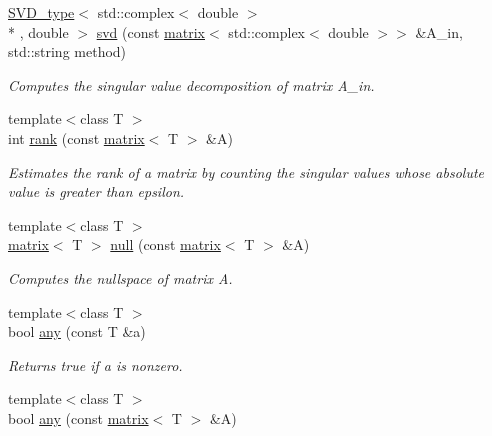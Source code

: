 \begin{DoxyCompactItemize}
\item 
\hypertarget{namespacekeycpp_ad610adca37ac4c85df23b899d29d5dfc}{\hyperlink{classkeycpp_1_1_s_v_d__type}{S\-V\-D\-\_\-type}$<$ std\-::complex$<$ double $>$\\*
, double $>$ \hyperlink{namespacekeycpp_ad610adca37ac4c85df23b899d29d5dfc}{svd} (const \hyperlink{classkeycpp_1_1matrix}{matrix}$<$ std\-::complex$<$ double $>$$>$ \&A\-\_\-in, std\-::string method)}\label{namespacekeycpp_ad610adca37ac4c85df23b899d29d5dfc}

\begin{DoxyCompactList}\small\item\em Computes the singular value decomposition of matrix A\-\_\-in. \end{DoxyCompactList}\item 
\hypertarget{namespacekeycpp_aeb9efbc77cc58fa22403ea7ae5f4555c}{{\footnotesize template$<$class T $>$ }\\int \hyperlink{namespacekeycpp_aeb9efbc77cc58fa22403ea7ae5f4555c}{rank} (const \hyperlink{classkeycpp_1_1matrix}{matrix}$<$ T $>$ \&A)}\label{namespacekeycpp_aeb9efbc77cc58fa22403ea7ae5f4555c}

\begin{DoxyCompactList}\small\item\em Estimates the rank of a matrix by counting the singular values whose absolute value is greater than epsilon. \end{DoxyCompactList}\item 
\hypertarget{namespacekeycpp_a8f497e2da901adba0e1257be943595a1}{{\footnotesize template$<$class T $>$ }\\\hyperlink{classkeycpp_1_1matrix}{matrix}$<$ T $>$ \hyperlink{namespacekeycpp_a8f497e2da901adba0e1257be943595a1}{null} (const \hyperlink{classkeycpp_1_1matrix}{matrix}$<$ T $>$ \&A)}\label{namespacekeycpp_a8f497e2da901adba0e1257be943595a1}

\begin{DoxyCompactList}\small\item\em Computes the nullspace of matrix A. \end{DoxyCompactList}\item 
\hypertarget{namespacekeycpp_a70b89ab3e8f66f86c47c3bde004d4487}{{\footnotesize template$<$class T $>$ }\\bool \hyperlink{namespacekeycpp_a70b89ab3e8f66f86c47c3bde004d4487}{any} (const T \&a)}\label{namespacekeycpp_a70b89ab3e8f66f86c47c3bde004d4487}

\begin{DoxyCompactList}\small\item\em Returns true if a is nonzero. \end{DoxyCompactList}\item 
\hypertarget{namespacekeycpp_ade6d308fd22d34ad4860e5fcd22ccb39}{{\footnotesize template$<$class T $>$ }\\bool \hyperlink{namespacekeycpp_ade6d308fd22d34ad4860e5fcd22ccb39}{any} (const \hyperlink{classkeycpp_1_1matrix}{matrix}$<$ T $>$ \&A)}\label{namespacekeycpp_ade6d308fd22d34ad4860e5fcd22ccb39}


\end{DoxyCompactItemize}
